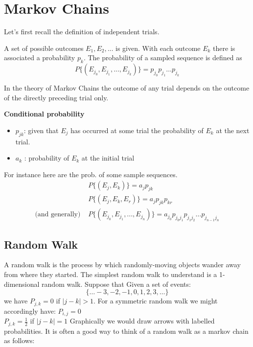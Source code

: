 \chapter{Markov Chains}
Let's first recall the definition of independent trials.
\begin{definition}
A set of possible outcomes $E_1,E_2,...$ is given. With each outcome $E_k$ there is associated a probability $p_k$. The probability of a sampled sequence is defined as
$$ P\{(E_{j_0},E_{j_1},...,E_{j_k})\} = p_{j_0} p_{j_1} \hdots p_{j_k}$$
\end{definition}

\medskip
\noindent In the theory of Markov Chains the outcome of any trial depends on the outcome of the directly preceding trial only. 

\medskip
\noindent \textbf{Conditional probability}
\begin{itemize}
    \item $p_{jk}$: given that $E_j$ has occurred at some trial the probability of $E_k$ at the next trial.
    \item $a_k$ : probability of $E_k$ at the initial trial 
\end{itemize}
For instance here are the prob. of some sample sequences.
\begin{align*}
    &P\{(E_j,E_k)\} = a_j p_{jk}\\
    &P\{(E_j,E_k,E_r) \} = a_j p_{jk} p_{kr}\\
    \textrm{(and generally) }& P\{(E_{j_0},E_{j_1},...,E_{j_n})\} = a_{j_0} p_{j_0 j_1} p_{j_1 j_2} \hdots p_{j_{n-1} j_n}
\end{align*}

\section{Random Walk}
A random walk is the process by which randomly-moving objects wander away from where they started.
The simplest random walk to understand is a 1-dimensional random walk. Suppose that 
Given a set of events: 
$$ \{\dots -3, -2, -1, 0, 1, 2, 3, \dots\}$$
we have $P_{j,k} = 0$ if $ | j - k | > 1$. For a symmetric random walk we might accordingly have: $ P_{i, j} = 0$\\
$ P_{j, k} = \frac{1}{2}$ if $|j - k| = 1$
Graphically we would draw arrows with labelled probabilities. It is often a good way to think of a random walk as a markov chain as follows: 


